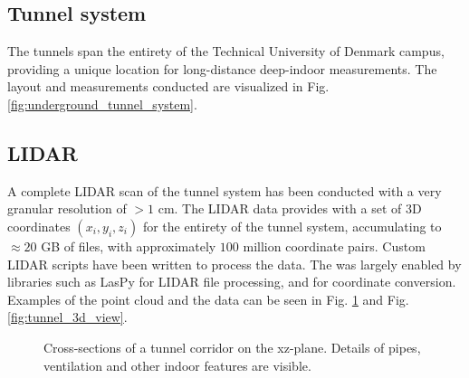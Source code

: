\subsection{Tunnel system}
The tunnels span the entirety of the Technical University of Denmark campus, providing a unique location for long-distance deep-indoor measurements. The layout and measurements conducted are visualized in Fig. \ref{fig:underground_tunnel_system}.

\subsection{LIDAR}
A complete LIDAR scan of the tunnel system has been conducted with a very granular resolution of $> 1$ cm. The LIDAR data provides with a set of $3$D coordinates $(x_i, y_i, z_i)$ for the entirety of the tunnel system, accumulating to $\approx 20$ GB of files, with approximately $100$ million coordinate pairs. Custom LIDAR scripts have been written to process the data. The was largely enabled by libraries such as LasPy \cite{Grantbrown/laspy:1.0-1.4.} for LIDAR file processing, and \cite{alan_d_snow_2020_3714221} for coordinate conversion. Examples of the point cloud and the data can be seen in Fig. \ref{fig:tunnel_cross_section} and Fig. \ref{fig:tunnel_3d_view}.

\begin{figure}[thbp]
    \centering
    \caption{Cross-sections of a tunnel corridor on the xz-plane. Details of pipes, ventilation and other indoor features are visible.}\label{fig:tunnel_cross_section}
    \vspace{2em}
\end{figure}

